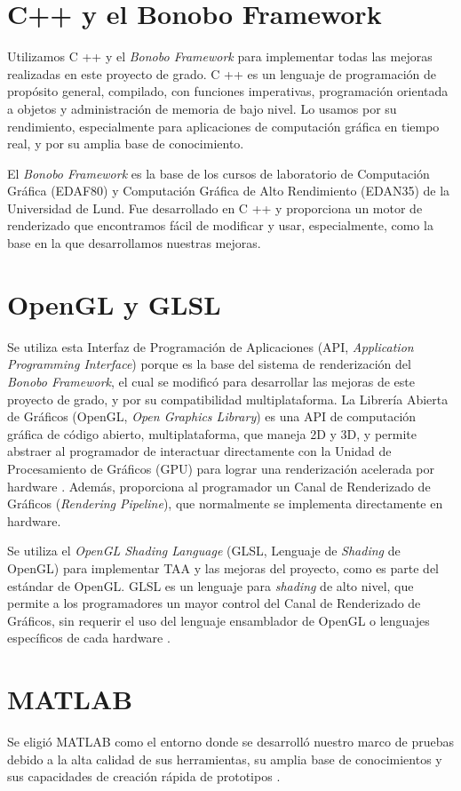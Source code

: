 \documentclass[pregrado]{tesis-usb} %
\begin{document}
\section{C++ y el Bonobo Framework}
Utilizamos C ++ y el \textit{Bonobo Framework} para implementar todas las mejoras realizadas en este proyecto de grado. C ++ es un lenguaje de programación de propósito general, compilado, con funciones imperativas, programación orientada a objetos y administración de memoria de bajo nivel. Lo usamos por su rendimiento, especialmente para aplicaciones de computación gráfica en tiempo real, y por su amplia base de conocimiento.

El \textit{Bonobo Framework} es la base de los cursos de laboratorio de Computación Gráfica (EDAF80) y Computación Gráfica de Alto Rendimiento (EDAN35) de la Universidad de Lund. Fue desarrollado en C ++ y proporciona un motor de renderizado que encontramos fácil de modificar y usar, especialmente, como la base en la que desarrollamos nuestras mejoras.


\section{OpenGL y GLSL}
Se utiliza esta Interfaz de Programación de Aplicaciones (API, \textit{Application Programming Interface}) porque es la base del sistema de renderización del \textit{Bonobo Framework}, el cual se modificó para desarrollar las mejoras de este proyecto de grado, y por su compatibilidad multiplataforma. La Librería Abierta de Gráficos (OpenGL, \textit{Open Graphics Library}) es una API de computación gráfica de código abierto, multiplataforma, que maneja 2D y 3D, y permite abstraer al programador de interactuar directamente con la Unidad de Procesamiento de Gráficos (GPU) para lograr una renderización acelerada por hardware \cite{Doggett2017EDAF80}. Además, proporciona al programador un Canal de Renderizado de Gráficos (\textit{Rendering Pipeline}), que normalmente se implementa directamente en hardware.

Se utiliza el \textit{OpenGL Shading Language} (GLSL, Lenguaje de \textit{Shading} de OpenGL) para implementar TAA y las mejoras del proyecto, como es parte del estándar de OpenGL. GLSL es un lenguaje para \textit{shading} de alto nivel, que permite a los programadores un mayor control del Canal de Renderizado de Gráficos, sin requerir el uso del lenguaje ensamblador de OpenGL o lenguajes específicos de cada hardware \cite{Doggett2017EDAF80}.

\section{MATLAB}
Se eligió MATLAB como el entorno donde se desarrolló nuestro marco de pruebas debido a la alta calidad de sus herramientas, su amplia base de conocimientos y sus capacidades de creación rápida de prototipos \cite{Doggett2017EDAF80, themathworks2018}.
\end{document}
